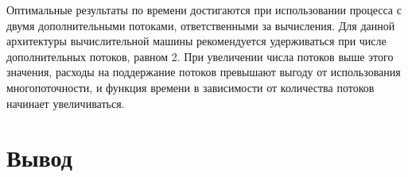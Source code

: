 
\clearpage


Оптимальные результаты по времени достигаются при использовании процесса с двумя дополнительными потоками, ответственными за вычисления. Для данной архитектуры вычислительной машины рекомендуется удерживаться при числе дополнительных потоков, равном 2. При увеличении числа потоков выше этого значения, расходы на поддержание потоков превышают выгоду от использования многопоточности, и функция времени в зависимости от количества потоков начинает увеличиваться.

\clearpage

\section*{Вывод}

